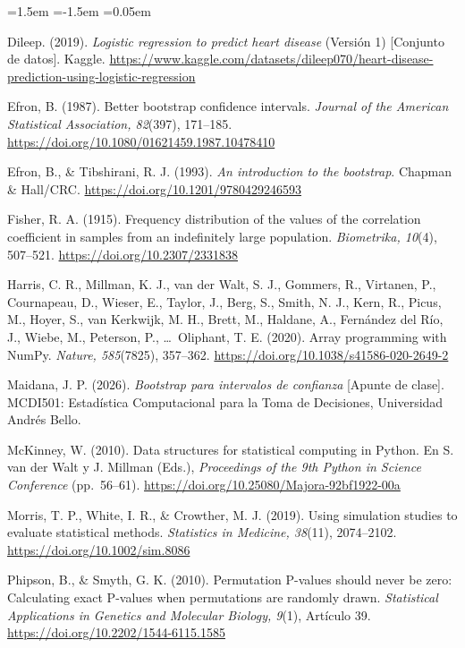 \documentclass[11pt,a4paper]{article}
\begin{document}
\begin{list}{}{\leftmargin=1.5em \itemindent=-1.5em \itemsep=0.05em \parsep=0pt}\footnotesize\raggedright
\item Dileep. (2019). \textit{Logistic regression to predict heart disease} (Versión 1) [Conjunto de datos]. Kaggle. \url{https://www.kaggle.com/datasets/dileep070/heart-disease-prediction-using-logistic-regression}
\item Efron, B. (1987). Better bootstrap confidence intervals. \textit{Journal of the American Statistical Association, 82}(397), 171--185. \url{https://doi.org/10.1080/01621459.1987.10478410}
\item Efron, B., \& Tibshirani, R. J. (1993). \textit{An introduction to the bootstrap}. Chapman \& Hall/CRC. \url{https://doi.org/10.1201/9780429246593}
\item Fisher, R. A. (1915). Frequency distribution of the values of the correlation coefficient in samples from an indefinitely large population. \textit{Biometrika, 10}(4), 507--521. \url{https://doi.org/10.2307/2331838}
\item Harris, C. R., Millman, K. J., van der Walt, S. J., Gommers, R., Virtanen, P., Cournapeau, D., Wieser, E., Taylor, J., Berg, S., Smith, N. J., Kern, R., Picus, M., Hoyer, S., van Kerkwijk, M. H., Brett, M., Haldane, A., Fernández del Río, J., Wiebe, M., Peterson, P., \dots\ Oliphant, T. E. (2020). Array programming with NumPy. \textit{Nature, 585}(7825), 357--362. \url{https://doi.org/10.1038/s41586-020-2649-2}
\item Maidana, J. P. (2026). \textit{Bootstrap para intervalos de confianza} [Apunte de clase]. MCDI501: Estadística Computacional para la Toma de Decisiones, Universidad Andrés Bello.
\item McKinney, W. (2010). Data structures for statistical computing in Python. En S. van der Walt y J. Millman (Eds.), \textit{Proceedings of the 9th Python in Science Conference} (pp.~56--61). \url{https://doi.org/10.25080/Majora-92bf1922-00a}
\item Morris, T. P., White, I. R., \& Crowther, M. J. (2019). Using simulation studies to evaluate statistical methods. \textit{Statistics in Medicine, 38}(11), 2074--2102. \url{https://doi.org/10.1002/sim.8086}
\item Phipson, B., \& Smyth, G. K. (2010). Permutation P-values should never be zero: Calculating exact P-values when permutations are randomly drawn. \textit{Statistical Applications in Genetics and Molecular Biology, 9}(1), Artículo 39. \url{https://doi.org/10.2202/1544-6115.1585}

\end{list}
\end{document}
